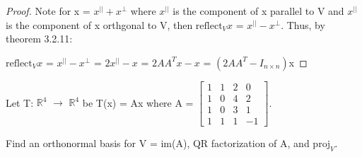     \begin{proof}
        Note for x = $x^{||} + x^{\perp}$ where $x^{||}$ is the component of x
        parallel to V and $x^{||}$ is the component of x orthgonal to V, then
        $\text{reflect}_Vx$ = $x^{||} - x^{\perp}$.
        Thus, by {\color{red} theorem 3.2.11}:

        \hspace{0.5cm}
        $\text{reflect}_Vx$
        = $x^{||} - x^{\perp}$
        = $2x^{||} - x$
        = $2AA^Tx - x$
        = $(2AA^T - I_{n \times n})$x
    \end{proof}

    \newpage



    \begin{example}
        Let T: $\mathbb{R}^4$ $\rightarrow$ $\mathbb{R}^4$ be T(x) = Ax
        where A =
        \scriptsize
        $\begin{bmatrix}
            1 & 1 & 2 & 0 \\
            1 & 0 & 4 & 2 \\
            1 & 0 & 3 & 1 \\
            1 & 1 & 1 & -1
        \end{bmatrix}$.
        \normalsize

        Find an orthonormal basis for V = im(A), QR factorization of A,
        and $\text{proj}_V$.
    \end{example}

